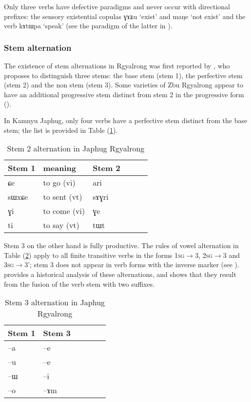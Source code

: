 \documentclass[oldfontcommands,oneside,a4paper,11pt]{article}
\newcommand{\ipa}[1]{{\phon \mbox{#1}}} %
\newcommand{\refb}[1]{(\ref{#1})}
\begin{document}
Only three verbs have defective paradigms and never occur with directional prefixes: the sensory existential copulas \ipa{ɣɤʑu} `exist' and \ipa{maŋe} `not exist' and the verb \ipa{kɤtɯpa} `speak' (see the paradigm of the latter in \citealt[1215]{jacques12incorp}).

\subsubsection{Stem alternation} \label{sec:stem}
The existence of stem alternations in Rgyalrong was first reported by \citet{jackson00puxi}, who proposes to distinguish three stems: the base stem (stem 1), the perfective stem (stem 2) and the non stem (stem 3). Some varieties of Zbu Rgyalrong appear to have an additional progressive stem distinct from stem 2 in the progressive form (\citealt[352]{jacques04these}).


In Kamnyu Japhug, only four verbs have a   perfective stem distinct from the base stem; the list is provided in Table \refb{tab:stem2}. 


 \begin{table} 
\caption{Stem 2 alternation in Japhug Rgyalrong} \label{tab:stem2} \centering
\begin{tabular}{llllll}
\toprule
Stem 1 & meaning &Stem 2 \\
\midrule
\ipa{ɕe}& to go (vi)&  \ipa{ari} \\
\ipa{sɯxɕe}& to sent (vt)  &\ipa{sɤɣri} \\
\ipa{ɣi}& to come (vi)  &\ipa{ɣe} \\
\ipa{ti}& to say (vt)  &\ipa{tɯt} \\
\bottomrule
\end{tabular}
\end{table}


Stem 3 on the other hand is fully productive. The rules of vowel alternation in Table \refb{tab:stem3} apply to all finite transitive verbs in the forms \textsc{1sg}$\rightarrow$3, \textsc{2sg}$\rightarrow$3 and \textsc{3sg}$\rightarrow$3'; stem 3 does not appear in verb forms with the inverse marker (see \citealt{gongxun14agreement}). \citet[351-7]{jacques04these} provides a historical analysis of these alternations, and shows that they result from the fusion of the verb stem with two suffixes. %

 \begin{table} 
\caption{Stem 3 alternation in Japhug Rgyalrong} \label{tab:stem3} \centering
\begin{tabular}{llllll}
\toprule
Stem 1 & Stem 3 \\
\midrule
\ipa{--a} & \ipa{--e} \\
\ipa{--u} & \ipa{--e} \\
\ipa{--ɯ} & \ipa{--i} \\
\ipa{--o} & \ipa{--ɤm} \\
\bottomrule
\end{tabular}
\end{table}
\end{document}
